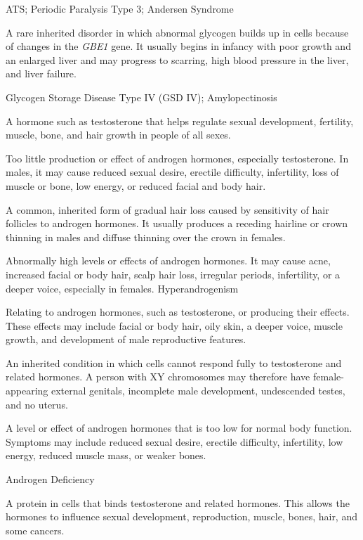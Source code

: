 \synonyms
ATS; Periodic Paralysis Type 3; Andersen Syndrome

 A rare inherited disorder in which abnormal glycogen builds up in cells because of changes in the \textit{GBE1} gene. It usually begins in infancy with poor growth and an enlarged liver and may progress to scarring, high blood pressure in the liver, and liver failure.

\synonyms
Glycogen Storage Disease Type IV (GSD IV); Amylopectinosis

 A hormone such as testosterone that helps regulate sexual development, fertility, muscle, bone, and hair growth in people of all sexes.

 Too little production or effect of androgen hormones, especially testosterone. In males, it may cause reduced sexual desire, erectile difficulty, infertility, loss of muscle or bone, low energy, or reduced facial and body hair.

 A common, inherited form of gradual hair loss caused by sensitivity of hair follicles to androgen hormones. It usually produces a receding hairline or crown thinning in males and diffuse thinning over the crown in females.

 Abnormally high levels or effects of androgen hormones. It may cause acne, increased facial or body hair, scalp hair loss, irregular periods, infertility, or a deeper voice, especially in females.
\synonyms
Hyperandrogenism

 Relating to androgen hormones, such as testosterone, or producing their effects. These effects may include facial or body hair, oily skin, a deeper voice, muscle growth, and development of male reproductive features.

 An inherited condition in which cells cannot respond fully to testosterone and related hormones. A person with XY chromosomes may therefore have female-appearing external genitals, incomplete male development, undescended testes, and no uterus.

 A level or effect of androgen hormones that is too low for normal body function. Symptoms may include reduced sexual desire, erectile difficulty, infertility, low energy, reduced muscle mass, or weaker bones.

\synonyms
Androgen Deficiency

 A protein in cells that binds testosterone and related hormones. This allows the hormones to influence sexual development, reproduction, muscle, bones, hair, and some cancers.

